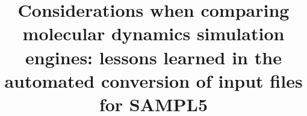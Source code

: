 %
%
%
%
%
%
\RequirePackage{fix-cm}
%
\documentclass[smallextended]{svjour3}       %
%
\smartqed  %
%
\usepackage{graphicx}
\usepackage{tabulary}
%
%
\usepackage{color}
\usepackage{caption}
\usepackage{float}
\usepackage{amssymb}
\usepackage{multirow}
\usepackage{multirow}
\usepackage[numbers, square,sort&compress]{natbib}
\graphicspath{{figures/}}
%
\newcommand{\BibTex}{\textsc{Bib}\TeX}
\newcommand{\erfc}{\mathrm{erfc}}
%
%


\title{Considerations when comparing molecular dynamics simulation engines: lessons learned in the automated conversion of input files for SAMPL5}

